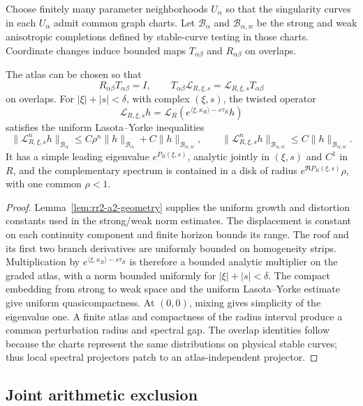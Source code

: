 Choose finitely many parameter neighborhoods \(U_\alpha\) so that the
singularity curves in each \(U_\alpha\) admit common graph charts.  Let
\(\mathcal B_\alpha\) and \(\mathcal B_{\alpha,w}\) be the strong and weak
anisotropic completions defined by stable-curve testing in those charts.
Coordinate changes induce bounded maps \(T_{\alpha\beta}\) and
\(R_{\alpha\beta}\) on overlaps.

\begin{theorem}
\label{thm:rr2-a2-atlas}
The atlas can be chosen so that
\[
 R_{\alpha\beta}T_{\alpha\beta}=I,\qquad
 T_{\alpha\beta}\mathcal L_{R,\xi,s}
 =
 \mathcal L_{R,\xi,s}T_{\alpha\beta}
\]
on overlaps.  For \(|\xi|+|s|<\delta\), with complex \((\xi,s)\), the twisted
operator
\[
 \mathcal L_{R,\xi,s}h
 =\mathcal L_R\!\left(
 e^{\langle\xi,\kappa_R\rangle-s\tau_R}h\right)
\]
satisfies the uniform Lasota--Yorke inequalities
\[
 \|\mathcal L_{R,\xi,s}^nh\|_{\mathcal B_\alpha}
 \le C\rho^n\|h\|_{\mathcal B_\alpha}
     +C\|h\|_{\mathcal B_{\alpha,w}},
 \qquad
 \|\mathcal L_{R,\xi,s}^nh\|_{\mathcal B_{\alpha,w}}
 \le C\|h\|_{\mathcal B_{\alpha,w}}.
\]
It has a simple leading eigenvalue
\(e^{P_R(\xi,s)}\), analytic jointly in \((\xi,s)\) and \(C^1\) in \(R\),
and the complementary spectrum is contained in a disk of radius
\(e^{\Re P_R(\xi,s)}\rho\), with one common \(\rho<1\).
\end{theorem}

\begin{proof}
Lemma~\ref{lem:rr2-a2-geometry} supplies the uniform growth and distortion
constants used in the strong/weak norm estimates.  The displacement is
constant on each continuity component and finite horizon bounds its range.
The roof and its first two branch derivatives are uniformly bounded on
homogeneity strips.  Multiplication by
\(e^{\langle\xi,\kappa_R\rangle-s\tau_R}\) is therefore a bounded analytic
multiplier on the graded atlas, with a norm bounded uniformly for
\(|\xi|+|s|<\delta\).  The compact embedding from strong to weak space and
the uniform Lasota--Yorke estimate give uniform quasicompactness.
At \((0,0)\), mixing gives simplicity of the eigenvalue one.  A finite atlas
and compactness of the radius interval produce a common perturbation radius
and spectral gap.  The overlap identities follow because the charts
represent the same distributions on physical stable curves; thus local
spectral projectors patch to an atlas-independent projector.
\end{proof}

\subsection{Joint arithmetic exclusion}

